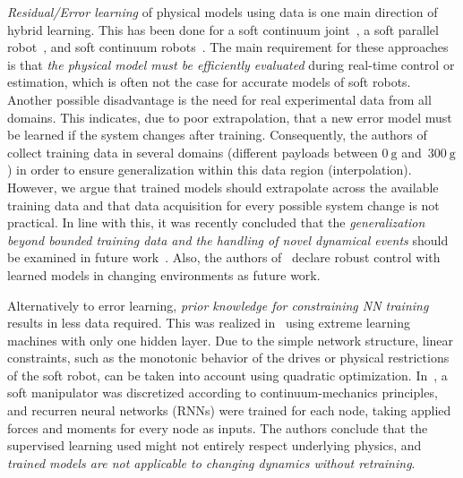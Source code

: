 \textit{Residual/Error learning} of physical models using data is one main direction of hybrid learning.
This has been done for a soft continuum joint~\cite{Johnson.2021}, a soft parallel robot~\cite{Huang.2024}, and soft continuum robots~\cite{Reinhart.2017, Gao.2024, Lou.2024, Jiahao.2024}. 
The main requirement for these approaches is that \textit{the physical model must be efficiently evaluated} during real-time control or estimation, which is often not the case for accurate models of soft robots.
Another possible disadvantage is the need for real experimental data from all domains.
This indicates, due to poor extrapolation, that a new error model must be learned if the system changes after training. 
Consequently, the authors of~\cite{Lou.2024} collect training data in several domains (different payloads between $\SI{0}{\gram}$ and~$\SI{300}{\gram}$) in order to ensure generalization within this data region (interpolation).
However, we argue that trained models should extrapolate across the available training data and that data acquisition for every possible system change is not practical.
In line with this, it was recently concluded that the \textit{generalization beyond bounded training data and the handling of novel dynamical events} should be examined in future work~\cite{Gao.2024}.
Also, the authors of~\cite{Huang.2024} declare robust control with learned models in changing environments as future work.

Alternatively to error learning, \textit{prior knowledge for constraining NN training} results in less data required. 
This was realized in~\cite{NEUMANN.2013} using extreme learning machines with only one hidden layer. 
Due to the simple network structure, linear constraints, such as the monotonic behavior of the drives or physical restrictions of the soft robot, can be taken into account using quadratic optimization. 
In~\cite{Tariverdi.2021}, a soft manipulator was discretized according to continuum-mechanics principles, and recurren neural networks (RNNs) were trained for each node, taking applied forces and moments for every node as inputs. 
The authors conclude that the supervised learning used might not entirely respect underlying physics, and \textit{trained models are not applicable to changing dynamics without retraining}.

